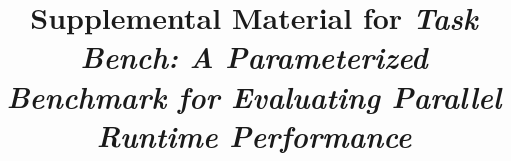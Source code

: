 



\title{Supplemental Material for \emph{Task Bench: A Parameterized Benchmark for Evaluating Parallel Runtime Performance}}

\maketitle

\appendix








